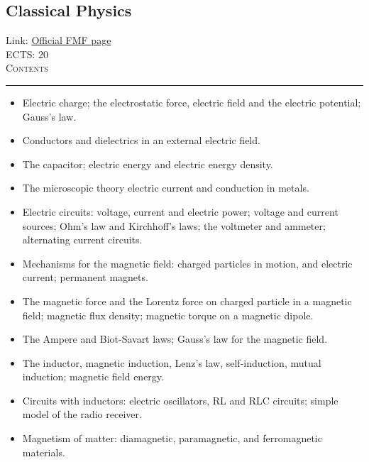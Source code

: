 \documentclass[11pt, a4paper]{article}
\newenvironment{course}[3]{
\subsection{#1}%
Link: \href{#2}{Official FMF page}\\%
ECTS: #3%
\vspace{1ex}
\\
{\large \textsc{Contents}}\\[-0.9ex]%
\rule{\textwidth}{0.5pt}
\vspace{-3ex}
}
{}
\newenvironment{chapter}[1]{
\begin{tcolorbox}[title=#1, breakable]
}
{\end{tcolorbox}}
\begin{document}
\begin{course}{Classical Physics}{https://www.fmf.uni-lj.si/en/study-physics/programmes/1fiz/2020/7000777/courses/1154/}{20}
\begin{chapter}{Electrostatics}
    \begin{itemize}

        \item Electric charge; the electrostatic force, electric field and the electric potential; Gauss’s law.
        
        \item Conductors and dielectrics in an external electric field. 

        \item The capacitor; electric energy and electric energy density. 

        \item The microscopic theory electric current and conduction in metals.

        \item Electric circuits: voltage, current and electric power; voltage and current sources; Ohm’s law and Kirchhoff’s laws; the voltmeter and ammeter; alternating current circuits.

    \end{itemize}
\end{chapter}

\begin{chapter}{Magnetostatics and magnetic induction}
    \begin{itemize}
    
        \item Mechanisms for the magnetic field: charged particles in motion, and electric current; permanent magnets.

        \item The magnetic force and the Lorentz force on charged particle in a magnetic field; magnetic flux density; magnetic torque on a magnetic dipole.

        \item The Ampere and Biot-Savart laws; Gauss's law for the magnetic field.

        \item The inductor, magnetic induction, Lenz's law, self-induction, mutual induction; magnetic field energy.

        \item Circuits with inductors: electric oscillators, RL and RLC circuits; simple model of the radio receiver.

        \item Magnetism of matter: diamagnetic, paramagnetic, and ferromagnetic materials. 
    \end{itemize}
\end{chapter}


\end{course}
\end{document}
